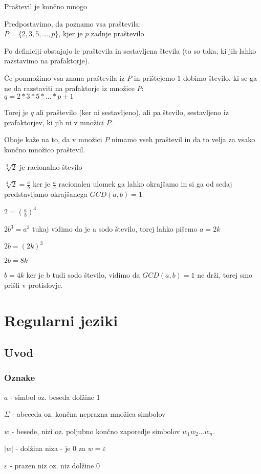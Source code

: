 \documentclass[10pt,a4paper,oneside]{book}
\begin{document}
\begin{primeri}
\item Praštevil je končno mnogo
	\begin{items}
	\item Predpostavimo, da poznamo vsa praštevila:\\
		$P = \{2,3,5,...,p\}$, kjer je $p$ zadnje praštevilo 
	\item Po definiciji obstajajo le praštevila in sestavljena števila (to so taka, ki jih lahko razstavimo na prafaktorje). 
	\item Če pomnožimo vsa znana praštevila iz $P$ in prištejemo $1$ dobimo število, ki se ga ne da razstaviti na prafaktorje iz množice $P$:\\
		$q = 2 * 3 * 5 * ... * p + 1$
	\item Torej je $q$ ali praštevilo (ker ni sestavljeno), ali pa število, sestavljeno iz prafaktorjev, ki jih ni v množici $P$.
	\item Oboje kaže na to, da v množici $P$ nimamo vseh praštevil in da to velja za vsako končno množico praštevil.
	\end{items}
\item $\sqrt[3]{2}$ je racionalno število 
	\begin{items}
	\item $\sqrt[3]{2} = \frac{a}{b}$ ker je $\frac{a}{b}$ racionalen ulomek ga lahko okrajšamo in si ga od sedaj predstavljamo okrajšanega $GCD(a,b)=1$
	\item $ 2 = \left( \frac{a}{b} \right)^3 $
	\item $2b^3 = a^3$ tukaj vidimo da je a sodo število, torej lahko pišemo $ a = 2k $
	\item $2b = \left( 2k\right)^3 $
	\item $2b = 8k $
	\item $b = 4k $ ker je b tudi sodo število, vidimo da $GCD(a,b)=1$ ne drži, torej smo prišli v protislovje.
	\end{items}
\end{primeri}

\pagebreak
\chapter{Regularni jeziki}

\section{Uvod}
\subsection*{Oznake}
\begin{items}
\item $a$ - simbol oz. beseda dolžine 1
\item $\Sigma$ - abeceda oz. končna neprazna množica simbolov
\item $w$ - besede, nizi oz. poljubno končno zaporedje  simbolov $w_1w_2 \ldots w_n$. 
\item $|w|$ - dolžina niza - je $0$ za $w = \varepsilon$
\item $\varepsilon$ - prazen niz oz. niz dolžine $0$
\end{items}
\end{document}
